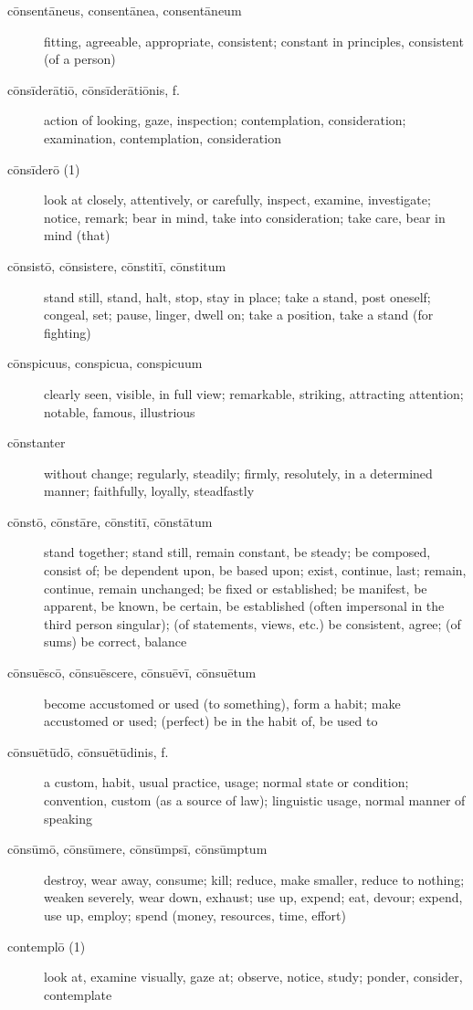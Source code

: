\begin{description}
    \item[cōnsentāneus, consentānea, consentāneum] fitting, agreeable, appropriate, consistent; constant in principles, consistent (of a person)
    \item[cōnsīderātiō, cōnsīderātiōnis, f.] action of looking, gaze, inspection; contemplation, consideration; examination, contemplation, consideration
    \item[cōnsīderō (1)] look at closely, attentively, or carefully, inspect, examine, investigate; notice, remark; bear in mind, take into consideration; take care, bear in mind (that)
    \item[cōnsistō, cōnsistere, cōnstitī, cōnstitum] \marginnote{*}stand still, stand, halt, stop, stay in place; take a stand, post oneself; congeal, set; pause, linger, dwell on; take a position, take a stand (for fighting)
    \item[cōnspicuus, conspicua, conspicuum] clearly seen, visible, in full view; remarkable, striking, attracting attention; notable, famous, illustrious
    \item[cōnstanter] without change; regularly, steadily; firmly, resolutely, in a determined manner; faithfully, loyally, steadfastly
    \item[cōnstō, cōnstāre, cōnstitī, cōnstātum] \marginnote{*}stand together; stand still, remain constant, be steady; be composed, consist of; be dependent upon, be based upon; exist, continue, last; remain, continue, remain unchanged; be fixed or established; be manifest, be apparent, be known, be certain, be established (often impersonal in the third person singular); (of statements, views, etc.) be consistent, agree; (of sums) be correct, balance
    \item[cōnsuēscō, cōnsuēscere, cōnsuēvī, cōnsuētum]  become accustomed or used (to something), form a habit; make accustomed or used; (perfect) be in the habit of, be used to
    \item[cōnsuētūdō, cōnsuētūdinis, f.] a custom, habit, usual practice, usage; normal state or condition; convention, custom (as a source of law); linguistic usage, normal manner of speaking
    \item[cōnsūmō, cōnsūmere, cōnsūmpsī, cōnsūmptum] \marginnote{*}destroy, wear away, consume; kill; reduce, make smaller, reduce to nothing; weaken severely, wear down, exhaust; use up, expend; eat, devour; expend, use up, employ; spend (money, resources, time, effort)
    \item[contemplō (1)] look at, examine visually, gaze at; observe, notice, study; ponder, consider, contemplate

\end{description}
